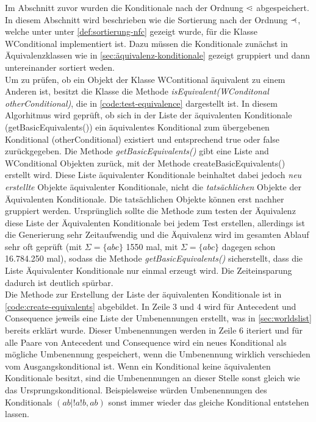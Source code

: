 \documentclass[12pt,a4paper]{article}
\newcommand\dotl{\mathrel{%
    \mathchoice{\QEQ}{\QEQ}{\QEQ}{\QEQ}%
}}
\def\QEQ{{%
    \setbox0\hbox{<}%
    \rlap{\hbox to \wd0{\hss \raisebox {0.1pt}{$\ \cdot$\hss}}}\box0
}}
\newcommand\rdotl{\mathrel{%
    \mathchoice{\RQEQ}{\RQEQ}{\RQEQ}{\RQEQ}%
}}
\def\RQEQ{{%
    \setbox0\hbox{$\prec$}%
    \rlap{\hbox to \wd0{\hss \raisebox {0.01pt}{$\ \cdot$\hss}}}\box0
}}
\begin{document}
Im Abschnitt zuvor wurden die Konditionale nach der Ordnung $\dotl$ abgespeichert. In diesem Abschnitt wird beschrieben wie die Sortierung nach der Ordnung $\rdotl$, welche unter unter \autoref{def:sortierung-nfc} gezeigt wurde, für die Klasse WConditional implementiert ist. Dazu müssen die Konditionale zunächst in Äquivalenzklassen wie in \autoref{sec:äquivalenz-konditionale} gezeigt gruppiert und dann untereinander sortiert weden. \\
Um zu prüfen, ob ein Objekt der Klasse WContitional äquivalent zu einem Anderen ist, besitzt die Klasse die Methode \textit{isEquivalent(WConditonal otherConditional)}, die in \autoref{code:test-equivalence} dargestellt ist. In diesem Algorhitmus wird geprüft, ob sich in der Liste der äquivalenten Konditionale (getBasicEquivalents()) ein äquivalentes Konditional zum übergebenen Konditional (otherConditional) existiert und entsprechend true oder false zurückgegeben. Die Methode \textit{getBasicEquivalents()} gibt eine Liste and WConditional Objekten zurück, mit der Methode createBasicEquivalents() erstellt wird. Diese Liste äquivalenter Konditionale beinhaltet dabei jedoch \textit{neu erstellte} Objekte äquivalenter Konditionale, nicht die \textit{tatsächlichen} Objekte der Äquivalenten Konditionale. Die tatsächlichen Objekte können erst nachher gruppiert werden. Ursprünglich sollte die Methode zum testen der Äquivalenz diese Liste der Äquivalenten Konditionale bei jedem Test erstellen, allerdings ist die Generierung sehr Zeitaufwendig und die Äquivalenz wird im gesamten Ablauf sehr oft geprüft (mit $\Sigma=\{abc \}$ 1550 mal, mit $\Sigma=\{abc\}$ dagegen schon 16.784.250 mal), sodass die Methode \textit{getBasicEquivalents()} sicherstellt, dass die Liste Äquivalenter Konditionale nur einmal erzeugt wird. Die Zeiteinsparung dadurch ist deutlich spürbar.\\ 
Die Methode zur Erstellung der Liste der äquivalenten Konditionale ist in \autoref{code:create-equivalents} abgebildet. In Zeile 3 und 4 wird für Antecedent und Consequence jeweils eine Liste der Umbenennungen erstellt, was in \autoref{sec:worldslist} bereits erklärt wurde. Dieser Umbenennungen werden in Zeile 6 iteriert und für alle Paare von Antecedent und Consequence wird ein neues Konditional als mögliche Umbenennung gespeichert, wenn die Umbenennung wirklich verschieden vom Ausgangskonditional ist. Wenn ein Konditional keine äquivalenten Konditionale besitzt, sind die Umbenennungen an dieser Stelle sonst gleich wie das Ursprungskonditional. Beispielsweise würden Umbenennungen des Konditionals $(ab|!a!b,ab)$ sonst immer wieder das gleiche Konditional entstehen lassen.
\end{document}
